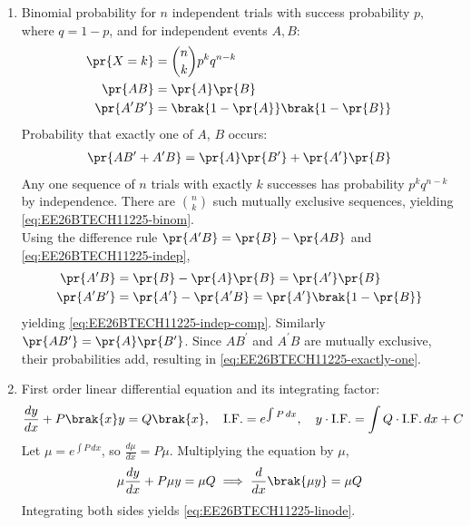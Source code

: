 \begin{enumerate}[label=\thesubsection.\arabic*, ref=\thesubsection.\theenumi]
\item Binomial probability for $n$ independent trials with success probability $p$, where $q = 1 - p$, and for independent events $A, B$:
\begin{align}
	\pr{X = k} &= \binom{n}{k}p^k q^{n - k}
	\label{eq:EE26BTECH11225-binom}
	\\
	\pr{AB} &= \pr{A}\pr{B}
	\label{eq:EE26BTECH11225-indep}
	\\
	\pr{A^{\prime}B^{\prime}} &= \brak{1 - \pr{A}}\brak{1 - \pr{B}}
	\label{eq:EE26BTECH11225-indep-comp}
\end{align}
Probability that exactly one of $A$, $B$ occurs:
\begin{align}
	\pr{AB^{\prime} + A^{\prime}B} = \pr{A}\pr{B^{\prime}} + \pr{A^{\prime}}\pr{B}
	\label{eq:EE26BTECH11225-exactly-one}
\end{align}
\solution
Any one sequence of $n$ trials with exactly $k$ successes has probability $p^k q^{n-k}$ by independence. There are $\binom{n}{k}$ such mutually exclusive sequences, yielding \eqref{eq:EE26BTECH11225-binom}.
\\
Using the difference rule $\pr{A^{\prime}B} = \pr{B} - \pr{AB}$ and \eqref{eq:EE26BTECH11225-indep},
\begin{align}
	\pr{A^{\prime}B} &= \pr{B} - \pr{A}\pr{B} = \pr{A^{\prime}}\pr{B}
	\\
	\pr{A^{\prime}B^{\prime}} &= \pr{A^{\prime}} - \pr{A^{\prime}B}
	= \pr{A^{\prime}}\brak{1 - \pr{B}}
\end{align}
yielding \eqref{eq:EE26BTECH11225-indep-comp}. Similarly $\pr{AB^{\prime}} = \pr{A}\pr{B^{\prime}}$. Since $AB^{\prime}$ and $A^{\prime}B$ are mutually exclusive, their probabilities add, resulting in \eqref{eq:EE26BTECH11225-exactly-one}.

\item First order linear differential equation and its integrating factor:
\begin{align}
	\frac{dy}{dx} + P\brak{x}y = Q\brak{x}, \quad \text{I.F.} = e^{\int P\,dx}, \quad y \cdot \text{I.F.} = \int Q \cdot \text{I.F.}\,dx + C
	\label{eq:EE26BTECH11225-linode}
\end{align}
\solution
Let $\mu = e^{\int P\,dx}$, so $\frac{d\mu}{dx} = P\mu$. Multiplying the equation by $\mu$,
\begin{align}
	\mu\frac{dy}{dx} + P\mu y = \mu Q
	\implies \frac{d}{dx}\brak{\mu y} = \mu Q
\end{align}
Integrating both sides yields \eqref{eq:EE26BTECH11225-linode}.


\end{enumerate}
